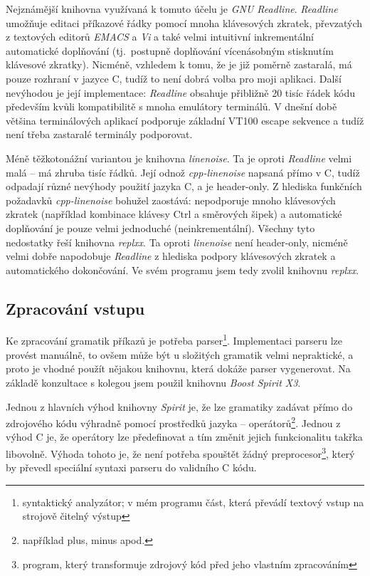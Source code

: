 \documentclass[thesis=B,czech,hidelinks]{FITthesis}[2019/03/06]
\newcommand{\Rplus}{\protect\hspace{-.1em}\protect\raisebox{.35ex}{\smaller{\smaller\textbf{+}}}}
\newcommand{\Cpp}{\mbox{C\Rplus\Rplus}\xspace}
\begin{document}
Nejznámější knihovna využívaná k tomuto účelu je \textit{GNU Readline}. \textit{Readline} umožňuje editaci příkazové řádky pomocí mnoha klávesových zkratek, převzatých z textových editorů \textit{EMACS} a \textit{Vi} a také velmi intuitivní inkrementální automatické doplňování (tj.\ postupně doplňování vícenásobným stisknutím klávesové zkratky). Nicméně, vzhledem k tomu, že je již poměrně zastaralá, má pouze rozhraní v jazyce C, tudíž to není dobrá volba pro moji aplikaci. Další nevýhodou je její implementace: \textit{Readline} obsahuje přibližně 20 tisíc řádek kódu především kvůli kompatibilitě s mnoha emulátory terminálů. V dnešní době většina terminálových aplikací podporuje základní VT100 escape sekvence a tudíž není třeba zastaralé terminály podporovat.

Méně těžkotonážní variantou je knihovna \textit{linenoise}. Ta je oproti \textit{Readline} velmi malá -- má zhruba tisíc řádků. Její odnož \textit{cpp-linenoise} napsaná přímo v \Cpp{}, tudíž odpadají různé nevýhody použití jazyka C, a je header-only. Z hlediska funkčních požadavků \textit{cpp-linenoise} bohužel zaostává: nepodporuje mnoho klávesových zkratek (například kombinace klávesy Ctrl a směrových šipek) a automatické doplňování je pouze velmi jednoduché (neinkrementální).  Všechny tyto nedostatky řeší knihovna \textit{replxx}. Ta oproti \textit{linenoise} není header-only, nicméně velmi dobře napodobuje \textit{Readline} z hlediska podpory klávesových zkratek a automatického dokončování. Ve svém programu jsem tedy zvolil knihovnu \textit{replxx}.


\subsection{Zpracování vstupu}

Ke zpracování gramatik příkazů je potřeba parser\footnote{syntaktický analyzátor; v mém programu část, která převádí textový vstup na strojově čitelný výstup}. Implementaci parseru lze provést manuálně, to ovšem může být u složitých gramatik velmi nepraktické, a proto je vhodné použít nějakou knihovnu, která dokáže parser vygenerovat. Na základě konzultace s kolegou jsem použil knihovnu \textit{Boost Spirit X3}.

Jednou z hlavních výhod knihovny \textit{Spirit} je, že lze gramatiky zadávat přímo do zdrojového kódu výhradně pomocí prostředků jazyka -- operátorů\footnote{například plus, minus apod.}. Jednou z výhod \Cpp{} je, že operátory lze předefinovat a tím změnit jejich funkcionalitu takřka libovolně. Výhoda tohoto je, že není potřeba spouštět žádný preprocesor\footnote{program, který transformuje zdrojový kód před jeho vlastním zpracováním}, který by převedl speciální syntaxi parseru do validního \Cpp{} kódu.
\end{document}
